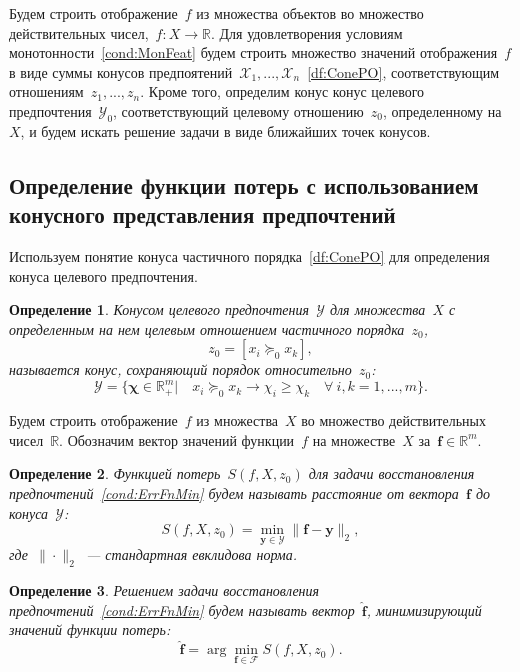 \documentclass{elsarticle}
\newcommand{\by}{\mathbf{y}}
\newcommand{\bfx}{\mathbf{f}}
\newcommand{\bchi}{\boldsymbol{\chi}}
\newcommand{\cX}{\mathcal{X}}
\newcommand{\cY}{\mathcal{Y}}
\newtheorem{df}{Определение}
\begin{document}
Будем строить отображение~$f$ из множества объектов во множество действительных чисел,~$f:X\rightarrow \mathbb{R}$. Для удовлетворения условиям монотонности~\eqref{cond:MonFeat} будем строить множество значений отображения~$f$ в виде суммы конусов предпоятений~$\cX_1,...,\cX_n$~\eqref{df:ConePO}, соответствующим отношениям~$z_1,...,z_n$. Кроме того, определим конус конус целевого предпочтения~$\cY_0$, соответствующий целевому отношению~$z_0$, определенному на~$X$, и будем искать решение задачи в виде ближайших точек конусов.

\subsection{Определение функции потерь с использованием конусного представления предпочтений}\label{subsec:LossFunCone}

Используем понятие конуса частичного порядка~\eqref{df:ConePO} для определения конуса целевого предпочтения.
\begin{df}
Конусом целевого предпочтения~$\cY$ для множества~$X$ с определенным на нем целевым отношением частичного порядка~$z_0$,
\[
z_0=[x_i \succeq_0 x_k],
\]
называется конус, сохраняющий порядок относительно~$z_0$:
\[
\cY=\{\bchi\in\mathbb{R}^m_+|\quad x_i\succeq_0 x_k\rightarrow \chi_{i}\geq \chi_{k}\quad \forall~i,k=1,...,m\}.
\]
\end{df}


Будем строить отображение~$f$ из множества~$X$ во множество действительных чисел~$\mathbb{R}$. Обозначим вектор значений функции~$f$ на множестве~$X$ за~$\bfx\in \mathbb{R}^m$.
\begin{df}
Функцией потерь~$S(f,X,z_0)$ для задачи восстановления предпочтений~\eqref{cond:ErrFnMin} будем называть расстояние от вектора~$\bfx$ до конуса~$\cY$:
\[
S(f,X,z_0)=\min\limits_{\by\in \cY}\|\bfx-\by\|_2,
\]
где~$\|\cdot\|_2$~--- стандартная евклидова норма.
\end{df}
\begin{df}
Решением задачи восстановления предпочтений~\eqref{cond:ErrFnMin} будем называть вектор~$\hat{\bfx}$, минимизирующий значений функции потерь:
\begin{equation}
\hat{\bfx}=\arg\min\limits_{\bfx\in \mathcal{F}}S(f,X,z_0).
\label{prob:ConeOpt}
\end{equation}
\end{df}
\end{document}
